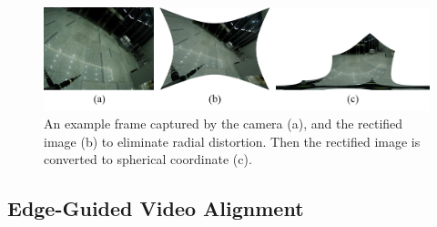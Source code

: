 \documentclass[conference]{IEEEtran}
\begin{document}
\begin{figure}[t]
\centering
\includegraphics[scale=0.23]{picture40.png}
\caption{An example frame captured by the camera (a), and the rectified image (b) to eliminate radial distortion. Then the rectified image is converted to spherical coordinate (c).}
\label{fig:ori_cal_pro}
\end{figure}




\subsection{Edge-Guided Video Alignment}
\label{ssec:edge-detection}
\end{document}
